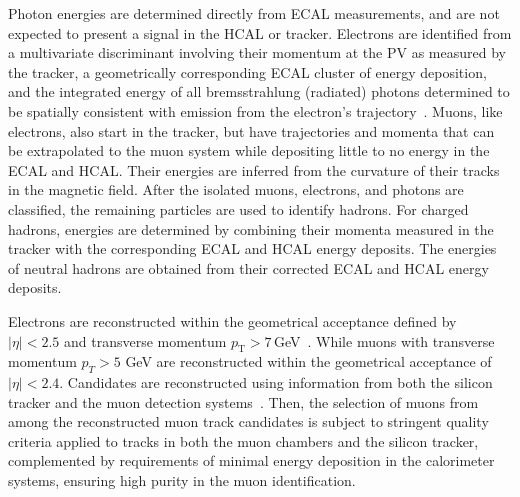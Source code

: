 Photon energies are determined directly from ECAL measurements, and are not expected to present a signal in the HCAL or tracker. Electrons are identified from a multivariate discriminant involving their momentum at the PV as measured by the tracker, a geometrically corresponding ECAL cluster of energy deposition, and the integrated energy of all bremsstrahlung (radiated) photons determined to be spatially consistent with emission from the electron's trajectory~\cite{Sirunyan:2021rug}. Muons, like electrons, also start in the tracker, but have trajectories and momenta that can be extrapolated to the muon system while depositing little to no energy in the ECAL and HCAL. Their energies are inferred from the curvature of their tracks in the magnetic field. After the isolated muons, electrons, and photons are classified, the remaining particles are used to identify hadrons. For charged hadrons, energies are determined by combining their momenta measured in the tracker with the corresponding ECAL and HCAL energy deposits. The energies of neutral hadrons are obtained from their corrected ECAL and HCAL energy deposits.

Electrons are reconstructed within the geometrical acceptance defined by $|\eta| < 2.5$ and transverse momentum $p_{\mathrm{T}} > 7$\,GeV~\cite{eleReco}. While muons with transverse momentum $p_T > 5$ GeV are reconstructed within the geometrical acceptance of $|\eta|< 2.4$. Candidates are reconstructed using information from both the silicon tracker and the muon detection systems~\cite{MuReco}. Then, the selection of muons from among the reconstructed muon track candidates is subject to stringent quality criteria applied to tracks in both the muon chambers and the silicon tracker, complemented by requirements of minimal energy deposition in the calorimeter systems, ensuring high purity in the muon identification.

